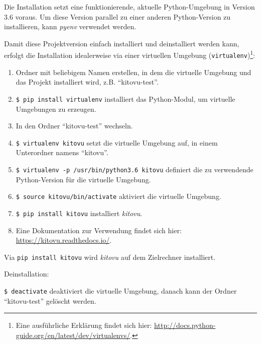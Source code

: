 \documentclass[a4paper]{article}
\begin{document}
Die Installation setzt eine funktionierende, aktuelle Python-Umgebung in Version 3.6 voraus. Um diese Version parallel zu einer anderen Python-Version zu installieren, kann \emph{pyenv} verwendet werden.

Damit diese Projektversion einfach installiert und deinstalliert werden kann, erfolgt die Installation idealerweise via einer virtuellen Umgebung (\verb|virtualenv|)\footnote{Eine ausführliche Erklärung findet sich hier: \url{http://docs.python-guide.org/en/latest/dev/virtualenvs/}.}:

\begin{enumerate}
	\item Ordner mit beliebigem Namen erstellen, in dem die virtuelle Umgebung und das Projekt installiert wird, z.B. ``kitovu-test''.
	\item \verb|$ pip install virtualenv| \newline
	installiert das Python-Modul, um virtuelle Umgebungen zu erzeugen.
	\item In den Ordner ``kitovu-test'' wechseln.
	\item \verb|$ virtualenv kitovu| \newline 
	setzt die virtuelle Umgebung auf, in einem Unterordner namens ``kitovu''.
	\item \verb|$ virtualenv -p /usr/bin/python3.6 kitovu| \newline
	definiert die zu verwendende Python-Version für die virtuelle Umgebung.
	\item \verb|$ source kitovu/bin/activate| \newline
	aktiviert die virtuelle Umgebung.
	\item \verb|$ pip install kitovu| \newline 
	installiert \emph{kitovu}.
	\item Eine Dokumentation zur Verwendung findet sich hier: \url{https://kitovu.readthedocs.io/}.
\end{enumerate}

Via \verb|pip install kitovu| wird \emph{kitovu} auf dem Zielrechner installiert.

Deinstallation: 

\verb|$ deactivate| deaktiviert die virtuelle Umgebung, danach kann der Ordner ``kitovu-test'' gelöscht werden.
\end{document}
